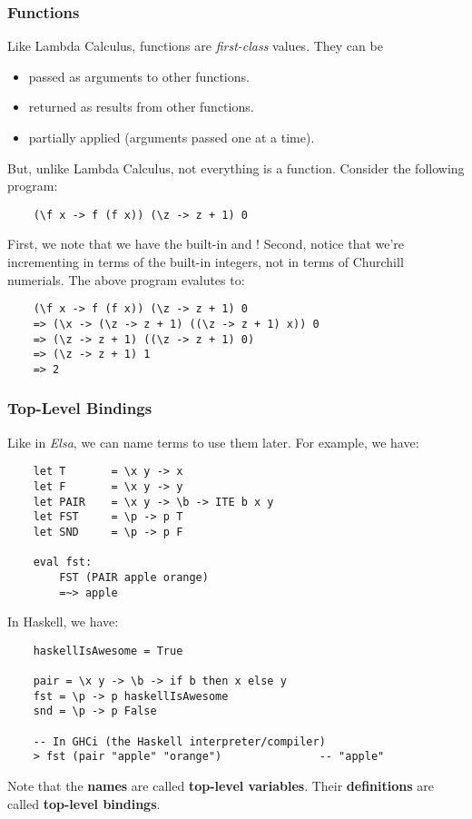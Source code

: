 \documentclass[letterpaper]{article}
\begin{document}
\subsubsection{Functions}
Like Lambda Calculus, functions are \emph{first-class} values. They can be 
\begin{itemize}
    \item passed as arguments to other functions. 
    \item returned as results from other functions. 
    \item partially applied (arguments passed one at a time).
\end{itemize}
But, unlike Lambda Calculus, not everything is a function. Consider the following program: 
\begin{verbatim}
    (\f x -> f (f x)) (\z -> z + 1) 0
\end{verbatim}
First, we note that we have the built-in  and ! Second, notice that we're incrementing in terms of the built-in integers, not in terms of Churchill numerials. The above program evalutes to: 
\begin{verbatim}
    (\f x -> f (f x)) (\z -> z + 1) 0
    => (\x -> (\z -> z + 1) ((\z -> z + 1) x)) 0
    => (\z -> z + 1) ((\z -> z + 1) 0)
    => (\z -> z + 1) 1
    => 2
\end{verbatim}

\subsubsection{Top-Level Bindings}
Like in \emph{Elsa}, we can name terms to use them later. For example, we have: 
\begin{verbatim}
    let T       = \x y -> x
    let F       = \x y -> y 
    let PAIR    = \x y -> \b -> ITE b x y 
    let FST     = \p -> p T 
    let SND     = \p -> p F 

    eval fst: 
        FST (PAIR apple orange)
        =~> apple 
\end{verbatim}
In Haskell, we have: 
\begin{verbatim}
    haskellIsAwesome = True 

    pair = \x y -> \b -> if b then x else y 
    fst = \p -> p haskellIsAwesome
    snd = \p -> p False 

    -- In GHCi (the Haskell interpreter/compiler)
    > fst (pair "apple" "orange")               -- "apple"
\end{verbatim}
Note that the \textbf{names} are called \textbf{top-level variables}. Their \textbf{definitions} are called \textbf{top-level bindings}.
\end{document}
